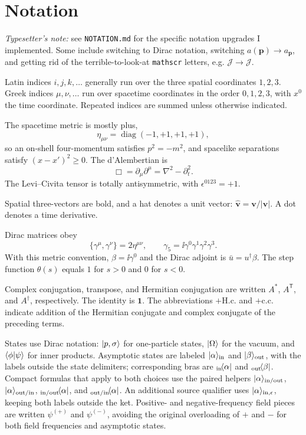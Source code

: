 \section*{Notation}

\emph{Typesetter's note:} see \verb|NOTATION.md| for the specific notation
upgrades I implemented. Some include switching to Dirac notation, switching
$a(\mathbf{p}) \to a_{\mathbf{p}}$, and getting rid of the terrible-to-look-at
\verb|mathscr| letters, e.g. $\mathscr{J} \to \mathcal{J}$.

Latin indices $i,j,k,\ldots$ generally run over the three spatial coordinates
$1,2,3$. Greek indices $\mu,\nu,\ldots$ run over spacetime coordinates in the
order $0,1,2,3$, with $x^0$ the time coordinate. Repeated indices are summed
unless otherwise indicated.

The spacetime metric is mostly plus,
\[
  \eta_{\mu\nu}=\operatorname{diag}(-1,+1,+1,+1),
\]
so an on-shell four-momentum satisfies $p^2=-m^2$, and spacelike separations
satisfy $(x-x')^2\geq 0$. The d'Alembertian is
\[
  \Box=\partial_\mu\partial^\mu=\nabla^2-\partial_t^2.
\]
The Levi--Civita tensor is totally antisymmetric, with
$\epsilon^{0123}=+1$.

Spatial three-vectors are bold, and a hat denotes a unit vector:
$\widehat{\mathbf v}=\mathbf v/\lvert\mathbf v\rvert$. A dot denotes a time
derivative.

Dirac matrices obey
\[
  \{\gamma^\mu,\gamma^\nu\}=2\eta^{\mu\nu},
  \qquad
  \gamma_5=\ii\gamma^0\gamma^1\gamma^2\gamma^3.
\]
With this metric convention, $\beta=\ii\gamma^0$ and the Dirac adjoint is
$\bar u=u^\dagger\beta$. The step function $\theta(s)$ equals $1$ for $s>0$
and $0$ for $s<0$.

Complex conjugation, transpose, and Hermitian conjugation are written $A^*$,
$A^{\mathsf T}$, and $A^\dagger$, respectively. The identity is $\mathbf{1}$.
The abbreviations $+\mathrm{H.c.}$ and $+\mathrm{c.c.}$ indicate addition of the
Hermitian conjugate and complex conjugate of the preceding terms.

States use Dirac notation: $\lvert p,\sigma\rangle$ for one-particle states,
$\lvert \Omega\rangle$ for the vacuum, and $\langle \phi | \psi\rangle$ for inner products.
Asymptotic states are labeled $\lvert \alpha\rangle_{\mathrm{in}}$ and $\lvert \beta\rangle_{\mathrm{out}}$, with the
labels outside the state delimiters; corresponding bras are ${}_{\mathrm{in}}\!\langle \alpha\rvert$
and ${}_{\mathrm{out}}\!\langle \beta\rvert$. Compact formulas that apply to both choices use the
paired helpers $\lvert \alpha\rangle_{\mathrm{in/out}}$, $\lvert \alpha\rangle_{\mathrm{out/in}}$,
${}_{\mathrm{in/out}}\!\langle \alpha\rvert$, and ${}_{\mathrm{out/in}}\!\langle \alpha\rvert$. An additional source qualifier
uses $\lvert \alpha\rangle_{\mathrm{in},\epsilon}$, keeping both labels outside the ket.
Positive- and negative-frequency
field pieces are written $\psi^{(+)}$ and $\psi^{(-)}$, avoiding the original
overloading of $+$ and $-$ for both field frequencies and asymptotic states.

